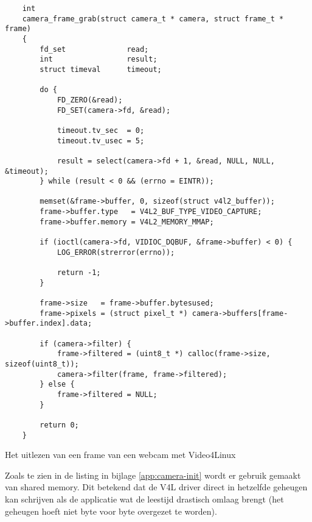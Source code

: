 \begin{listing}
    \begin{verbatim}
    int
    camera_frame_grab(struct camera_t * camera, struct frame_t * frame)
    {
        fd_set              read;
        int                 result;
        struct timeval      timeout;

        do {
            FD_ZERO(&read);
            FD_SET(camera->fd, &read);

            timeout.tv_sec  = 0;
            timeout.tv_usec = 5;

            result = select(camera->fd + 1, &read, NULL, NULL, &timeout);
        } while (result < 0 && (errno = EINTR));

        memset(&frame->buffer, 0, sizeof(struct v4l2_buffer));
        frame->buffer.type   = V4L2_BUF_TYPE_VIDEO_CAPTURE;
        frame->buffer.memory = V4L2_MEMORY_MMAP;

        if (ioctl(camera->fd, VIDIOC_DQBUF, &frame->buffer) < 0) {
            LOG_ERROR(strerror(errno));

            return -1;
        }

        frame->size   = frame->buffer.bytesused;
        frame->pixels = (struct pixel_t *) camera->buffers[frame->buffer.index].data;

        if (camera->filter) {
            frame->filtered = (uint8_t *) calloc(frame->size, sizeof(uint8_t));
            camera->filter(frame, frame->filtered);
        } else {
            frame->filtered = NULL;
        }

        return 0;
    }
    \end{verbatim}
    \caption{Het uitlezen van een frame van een webcam met Video4Linux}
    \label{lst:camera-read}
\end{listing}

Zoals te zien in de listing in bijlage \ref{app:camera-init} wordt er gebruik
gemaakt van shared memory. Dit betekend dat de V4L driver direct in hetzelfde
geheugen kan schrijven als de \autonerf applicatie wat de leestijd drastisch
omlaag brengt (het geheugen hoeft niet byte voor byte overgezet te worden).

